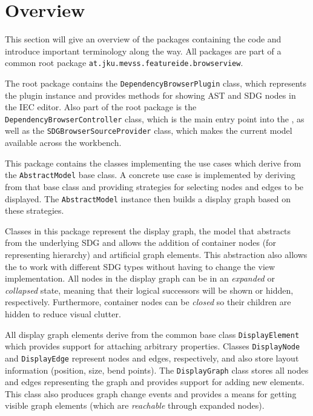 \section{Overview}

This section will give an overview of the packages containing the \SB code and introduce important terminology along 
the way. All packages are part of a common root package \lstinline|at.jku.mevss.featureide.browserview|. 

\begin{description}
  \item The root package contains the \lstinline|DependencyBrowserPlugin| class, which represents the plugin instance 
  and provides methods for showing AST and SDG nodes in the IEC editor. Also part of the root package is the 
  \lstinline|DependencyBrowserController| class, which is the main entry point   into the \SB, as well as the 
  \lstinline|SDGBrowserSourceProvider| class, which makes the current model available across the workbench.
  
   This package contains the classes implementing the use cases which derive from the 
  \lstinline|AbstractModel| base class. A concrete use case is implemented by deriving from that base class and 
  providing strategies for selecting nodes and edges to be displayed. The \lstinline|AbstractModel| instance then 
  builds a display graph based on these strategies.
  
   Classes in this package represent the display graph, the model that abstracts from the 
  underlying SDG and allows the addition of container nodes (for representing hierarchy) and artificial graph elements. 
  This abstraction also allows the \SB to work with different SDG types without having to change the view 
  implementation. All nodes in the display graph can be in an \emph{expanded} or \emph{collapsed} state, meaning that 
  their logical successors will be shown or hidden, respectively. Furthermore, container nodes can be \emph{closed} so 
  their children are hidden to reduce visual clutter.
  
  All display graph elements derive from the common base class \lstinline|DisplayElement| which provides support for 
  attaching arbitrary properties. Classes \lstinline|DisplayNode| and \lstinline|DisplayEdge| represent nodes and 
  edges, respectively, and also store layout information (position, size, bend points). The \lstinline|DisplayGraph| 
  class stores all nodes and edges representing the graph and provides support for adding new elements. This class also 
  produces graph change events and provides a means for getting visible graph elements (which are \emph{reachable} 
  through expanded nodes).
  

\end{description}
